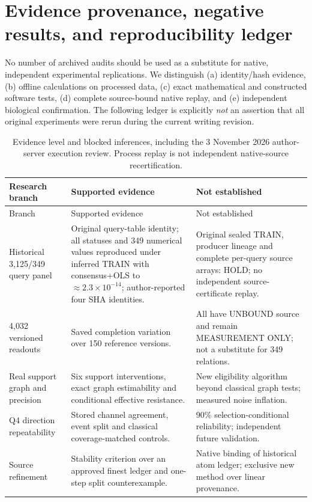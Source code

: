 \section{Evidence provenance, negative results, and reproducibility ledger}
\label{supp:ledger}
No number of archived audits should be used as a substitute for native, independent experimental replications. We distinguish (a) identity/hash evidence, (b) offline calculations on processed data, (c) exact mathematical and constructed software tests, (d) complete source-bound native replay, and (e) independent biological confirmation. The following ledger is explicitly \emph{not} an assertion that all original experiments were rerun during the current writing revision.
\begin{longtable}{@{}L{0.22\textwidth}L{0.40\textwidth}L{0.30\textwidth}@{}}
\caption{Evidence level and blocked inferences, including the 3 November 2026 author-server execution review. Process replay is not independent native-source recertification.}\label{tab:evidence-ledger}\\
\toprule Research branch & Supported evidence & Not established\\\midrule\endfirsthead
\toprule Branch & Supported evidence & Not established\\\midrule\endhead
Historical 3,125/349 query panel & Original query-table identity; all statuses and 349 numerical values reproduced under inferred TRAIN with consensus+OLS to $\approx 2.3\times10^{-14}$; author-reported four SHA identities. & Original sealed TRAIN, producer lineage and complete per-query source arrays: HOLD; no independent source-certificate replay.\\
4,032 versioned readouts & Saved completion variation over 150 reference versions. & All have UNBOUND source and remain MEASUREMENT ONLY; not a substitute for 349 relations.\\
Real support graph and precision & Six support interventions, exact graph estimability and conditional effective resistance. & New eligibility algorithm beyond classical graph tests; measured noise inflation.\\
Q4 direction repeatability & Stored channel agreement, event split and classical coverage-matched controls. & 90\% selection-conditional reliability; independent future validation.\\
Source refinement & Stability criterion over an approved finest ledger and one-step split counterexample. & Native binding of historical atom ledger; exclusive new method over linear provenance.\\

\end{longtable}
